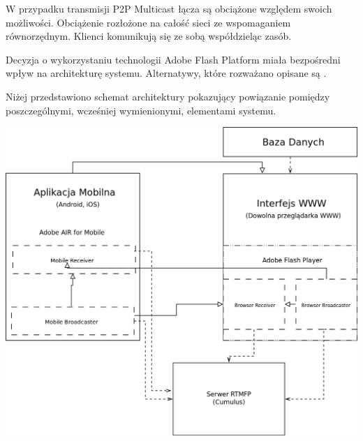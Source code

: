     W przypadku transmisji P2P Multicast łącza są obciążone względem swoich możliwości. Obciążenie rozłożone na całość sieci ze wspomaganiem równorzędnym. Klienci komunikują się ze sobą współdzieląc zasób.


Decyzja o wykorzystaniu technologii Adobe Flash Platform miała bezpośredni wpływ na architekturę systemu. Alternatywy, które rozważano opisane są .

Niżej przedstawiono schemat architektury pokazujący powiązanie pomiędzy poszczególnymi, wcześniej wymienionymi, elementami systemu.

\begin{center}
    \includegraphics[width=\textwidth]{diagramy/architektura.png}
\end{center}
